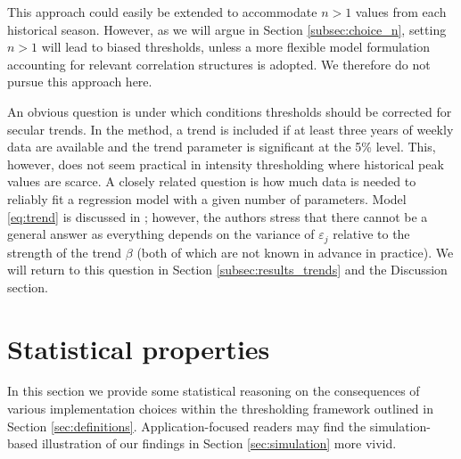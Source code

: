 \documentclass[12pt]{article}
\begin{document}
This approach could easily be extended to accommodate $n > 1$ values from each historical season. However, as we will argue in Section \ref{subsec:choice_n}, setting $n > 1$ will lead to biased thresholds, unless a more flexible model formulation accounting for relevant correlation structures is adopted. We therefore do not pursue this approach here.

An obvious question is under which conditions thresholds should be corrected for secular trends. In the \cite{Farrington1996} method, a trend is included if at least three years of weekly data are available and the trend parameter is significant at the 5\% level. This, however, does not seem practical in intensity thresholding where historical peak values are scarce. A closely related question is how much data is needed to reliably fit a regression model with a given number of parameters. Model \eqref{eq:trend} is discussed in \cite{Hyndman2007}; however, the authors stress that there cannot be a general answer as everything depends on the variance of $\varepsilon_j$ relative to the strength of the trend $\beta$ (both of which are not known in advance in practice). We will return to this question in Section \ref{subsec:results_trends} and the Discussion section.


 
\section{Statistical properties}
\label{sec:analytical_results}

In this section we provide some statistical reasoning on the consequences of various implementation choices within the thresholding framework outlined in Section \ref{sec:definitions}. Application-focused readers may find the simulation-based illustration of our findings in Section \ref{sec:simulation} more vivid. %
\end{document}
